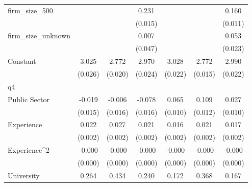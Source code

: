 {\begin{tabular}{l*{6}{c}}
firm\_size\_500       &                     &                     &       0.231\sym{***}&                     &                     &       0.160\sym{***}\\
                    &                     &                     &     (0.015)         &                     &                     &     (0.011)         \\
firm\_size\_unknown   &                     &                     &       0.007         &                     &                     &       0.053\sym{**} \\
                    &                     &                     &     (0.047)         &                     &                     &     (0.023)         \\
Constant            &       3.025\sym{***}&       2.772\sym{***}&       2.970\sym{***}&       3.028\sym{***}&       2.772\sym{***}&       2.990\sym{***}\\
                    &     (0.026)         &     (0.020)         &     (0.024)         &     (0.022)         &     (0.015)         &     (0.022)         \\
\hline
q4                  &                     &                     &                     &                     &                     &                     \\
Public Sector       &      -0.019         &      -0.006         &      -0.078\sym{***}&       0.065\sym{***}&       0.109\sym{***}&       0.027\sym{***}\\
                    &     (0.015)         &     (0.016)         &     (0.016)         &     (0.010)         &     (0.012)         &     (0.010)         \\
Experience          &       0.022\sym{***}&       0.027\sym{***}&       0.021\sym{***}&       0.016\sym{***}&       0.021\sym{***}&       0.017\sym{***}\\
                    &     (0.002)         &     (0.002)         &     (0.002)         &     (0.002)         &     (0.002)         &     (0.002)         \\
Experience^{2}      &      -0.000\sym{***}&      -0.000\sym{***}&      -0.000\sym{***}&      -0.000\sym{***}&      -0.000\sym{***}&      -0.000\sym{***}\\
                    &     (0.000)         &     (0.000)         &     (0.000)         &     (0.000)         &     (0.000)         &     (0.000)         \\
University          &       0.264\sym{***}&       0.434\sym{***}&       0.240\sym{***}&       0.172\sym{***}&       0.368\sym{***}&       0.167\sym{***}\\

\end{tabular}}
